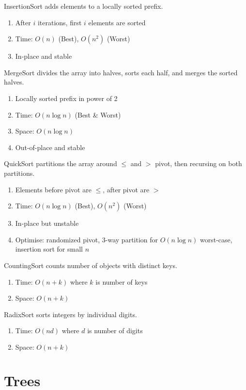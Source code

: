 \documentclass[12pt, a4paper]{article}
\begin{document}
\begin{multicols*}{3}
InsertionSort adds elements to a locally sorted prefix.
\begin{enumerate}[\roman*.]
  \item After $i$ iterations, first $i$ elements are sorted
  \item Time: $O(n)$ (Best), $O(n^2)$ (Worst) 
  \item In-place and stable
\end{enumerate}

MergeSort divides the array into halves, sorts each half, and merges the sorted halves.
\begin{enumerate}[\roman*.]
  \item Locally sorted prefix in power of 2
  \item Time: $O(n\log n)$ (Best \& Worst)
  \item Space: $O(n\log n)$
  \item Out-of-place and stable
\end{enumerate}

QuickSort partitions the array around $\leq$ and $>$ pivot, then recursing on both partitions.
\begin{enumerate}[\roman*.]
  \item Elements before pivot are $\leq$, after pivot are $>$
  \item Time: $O(n\log n)$ (Best), $O(n^2)$ (Worst)
  \item In-place but unstable
  \item Optimise: randomized pivot, 3-way partition for $O(n\log n)$ worst-case, insertion sort for small $n$
\end{enumerate}

CountingSort counts number of objects with distinct keys.
\begin{enumerate}[\roman*.]
  \item Time: $O(n + k)$ where $k$ is number of keys
  \item Space: $O(n + k)$
\end{enumerate}

RadixSort sorts integers by individual digits.
\begin{enumerate}[\roman*.]
  \item Time: $O(nd)$ where $d$ is number of digits
  \item Space: $O(n + k)$
\end{enumerate}

\section{Trees}

\end{multicols*}
\end{document}
